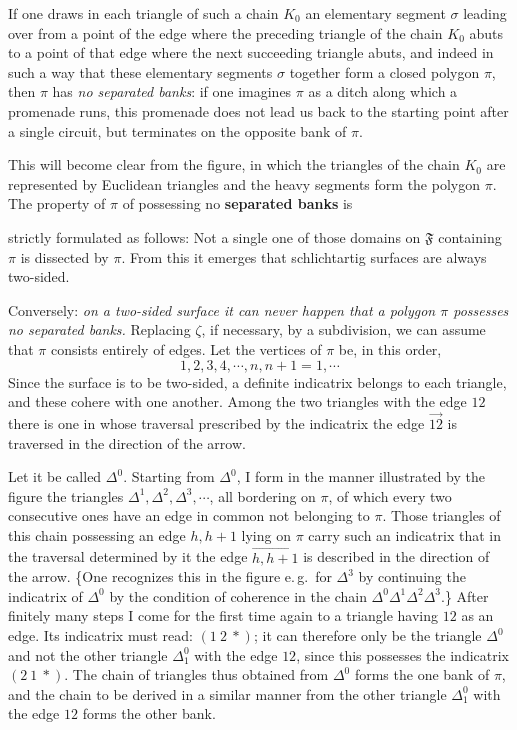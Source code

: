 \documentclass{article}
\begin{document}
If one draws in each triangle of such a chain $K_0$ an elementary segment $\sigma$ leading over from a point of the edge where the preceding triangle of the chain $K_0$ abuts to a point of that edge where the next succeeding triangle abuts, and indeed in such a way that these elementary segments $\sigma$ together form a closed polygon $\pi$, then $\pi$ has \emph{no separated banks}: if one imagines $\pi$ as a ditch along which a promenade runs, this promenade does not lead us back to the starting point after a single circuit, but terminates on the opposite bank of $\pi$.


This will become clear from the figure, in which the triangles of the chain $K_0$ are represented by Euclidean triangles and the heavy segments form the polygon $\pi$. The property of $\pi$ of possessing no \textbf{separated banks} is

strictly formulated as follows: Not a single one of those domains on $\mathfrak{F}$ containing $\pi$ is dissected by $\pi$. From this it emerges that schlichtartig surfaces are always two-sided.

Conversely: \emph{on a two-sided surface it can never happen that a polygon $\pi$ possesses no separated banks.} Replacing $\zeta$, if necessary, by a subdivision, we can assume that $\pi$ consists entirely of edges. Let the vertices of $\pi$ be, in this order,
\[ 1, 2, 3, 4, \cdots, n, n + 1 = 1, \cdots \]
Since the surface is to be two-sided, a definite indicatrix belongs to each triangle, and these cohere with one another. Among the two triangles with the edge $12$ there is one in whose traversal prescribed by the indicatrix the edge $\overrightarrow{12}$ is traversed in the direction of the arrow.


Let it be called $\Delta^0$. Starting from $\Delta^0$, I form in the manner illustrated by the figure the triangles $\Delta^1, \Delta^2, \Delta^3, \cdots$, all bordering on $\pi$, of which every two consecutive ones have an edge in common not belonging to $\pi$. Those triangles of this chain possessing an edge $h, h + 1$ lying on $\pi$ carry such an indicatrix that in the traversal determined by it the edge $\overrightarrow{h, h + 1}$ is described in the direction of the arrow. \{One recognizes this in the figure e.\,g.\ for $\Delta^3$ by continuing the indicatrix of $\Delta^0$ by the condition of coherence in the chain $\Delta^0 \Delta^1 \Delta^2 \Delta^3$.\} After finitely many steps I come for the first time again to a triangle having $12$ as an edge. Its indicatrix must read: $(1\ 2\ *)$; it can therefore only be the triangle $\Delta^0$ and not the other triangle $\Delta_1^0$ with the edge $12$, since this possesses the indicatrix $(2\ 1\ *)$. The chain of triangles thus obtained from $\Delta^0$ forms the one bank of $\pi$, and the chain to be derived in a similar manner from the other triangle $\Delta_1^0$ with the edge $12$ forms the other bank.
\end{document}
